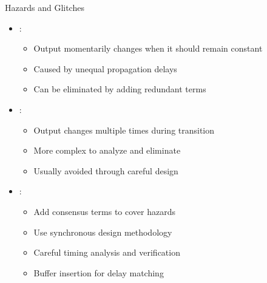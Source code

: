 \begin{frame}{Hazards and Glitches}
\begin{itemize}
\item {}:
\begin{itemize}
\item Output momentarily changes when it should remain constant
\item Caused by unequal propagation delays
\item Can be eliminated by adding redundant terms
\end{itemize}
\vspace{0.5cm}
\item {}:
\begin{itemize}
\item Output changes multiple times during transition
\item More complex to analyze and eliminate
\item Usually avoided through careful design
\end{itemize}
\vspace{0.5cm}
\item {}:
\begin{itemize}
\item Add consensus terms to cover hazards
\item Use synchronous design methodology
\item Careful timing analysis and verification
\item Buffer insertion for delay matching
\end{itemize}
\end{itemize}
\end{frame}

